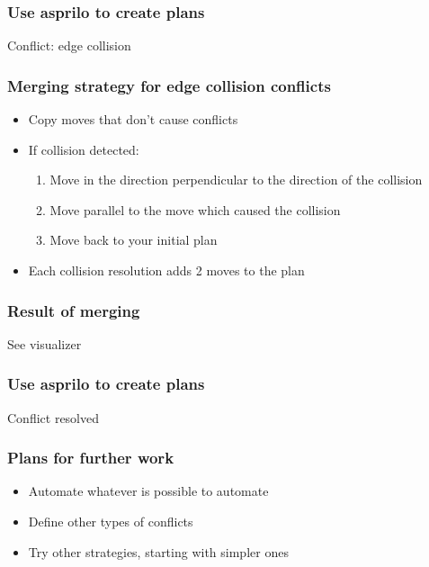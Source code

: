\documentclass{beamer}
\begin{document}
\begin{frame}
\frametitle{Use asprilo to create plans}
\centering
Conflict: edge collision
\end{frame}

\begin{frame}
\frametitle{Merging strategy for edge collision conflicts}
\begin{itemize} 
\item<1-> Copy moves that don't cause conflicts
\item<2-> If collision detected:
\begin{enumerate}
\item<3-> Move in the direction perpendicular to the direction of the collision
\item<4-> Move parallel to the move which caused the collision
\item<5-> Move back to your initial plan
\end{enumerate}
\item<6-> Each collision resolution adds 2 moves to the plan
\end{itemize} 
\end{frame}

\begin{frame}
\frametitle{Result of merging}
\centering
See visualizer
\end{frame}

\begin{frame}
\frametitle{Use asprilo to create plans}
\centering
Conflict resolved
\end{frame}

\begin{frame}
\frametitle{Plans for further work}
\begin{itemize} 
\item<1-> Automate whatever is possible to automate
\item<2-> Define other types of conflicts
\item<3-> Try other strategies, starting with simpler ones
\end{itemize} 
\end{frame}
\end{document}
